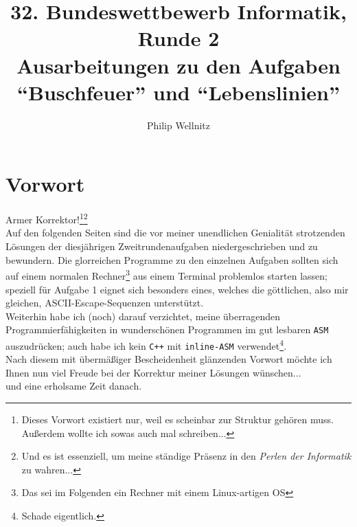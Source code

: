 \documentclass[a4paper,12pt,table]{article}
\title{32. Bundeswettbewerb Informatik, Runde 2\\ \small{Ausarbeitungen zu den Aufgaben \enquote{Buschfeuer} und \enquote{Lebenslinien} }}
\author{Philip Wellnitz}
\date{}
\begin{document}
\thispagestyle{empty}
\maketitle
\newpage
\section*{Vorwort}
Armer Korrektor!\footnote{Dieses Vorwort existiert nur, weil es scheinbar zur Struktur gehören muss. Außerdem wollte ich sowas auch mal schreiben...}\footnote{Und es ist essenziell, um meine ständige Präsenz in den \emph{Perlen der Informatik} zu wahren...}\\
Auf den folgenden Seiten sind die vor meiner unendlichen Genialität strotzenden Lösungen der diesjährigen Zweitrundenaufgaben niedergeschrieben und zu bewundern. Die glorreichen Programme zu den einzelnen Aufgaben sollten sich auf einem normalen Rechner\footnote{Das sei im Folgenden ein Rechner mit einem Linux-artigen OS} aus einem Terminal problemlos starten lassen; speziell für Aufgabe 1 eignet sich besonders eines, welches die göttlichen, also mir gleichen, ASCII-Escape-Sequenzen unterstützt.\\
Weiterhin habe ich (noch) darauf verzichtet, meine überragenden Programmierfähigkeiten in wunderschönen  Programmen im gut lesbaren \texttt{ASM} auszudrücken; auch habe ich kein \texttt{C++} mit \texttt{inline-ASM} verwendet\footnote{Schade eigentlich.}.\\
Nach diesem mit übermäßiger Bescheidenheit glänzenden Vorwort möchte ich Ihnen nun viel Freude bei der Korrektur meiner Lösungen wünschen...\\
und eine erholsame Zeit danach.
\tableofcontents
\newpage

\newpage
%
\newpage
\end{document}
